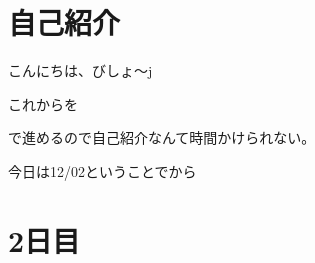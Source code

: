 \section{自己紹介}
\begin{frame}
	こんにちは、びしょ〜j

	\pause
	\bgroup\Huge
	\vspace{1\zw}
	これから\alert{}を

	で進めるので自己紹介なんて時間かけられない。
	\vspace{1\zw}
	\egroup

	今日は12/02ということでから
\end{frame}
\section{2日目}
